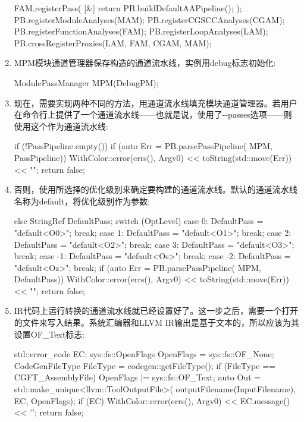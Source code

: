 \begin{enumerate}
\begin{cpp}
FAM.registerPass(
    [&] { return PB.buildDefaultAAPipeline(); });
PB.registerModuleAnalyses(MAM);
PB.registerCGSCCAnalyses(CGAM);
PB.registerFunctionAnalyses(FAM);
PB.registerLoopAnalyses(LAM);
PB.crossRegisterProxies(LAM, FAM, CGAM, MAM);
\end{cpp}

\item
MPM模块通道管理器保存构造的通道流水线，实例用debug标志初始化:

\begin{cpp}
ModulePassManager MPM(DebugPM);
\end{cpp}

\item
现在，需要实现两种不同的方法，用通道流水线填充模块通道管理器。若用户在命令行上提供了一个通道流水线——也就是说，使用了-{}-passes选项——则使用这个作为通道流水线:

\begin{cpp}
if (!PassPipeline.empty()) {
    if (auto Err = PB.parsePassPipeline(
    MPM, PassPipeline)) {
        WithColor::error(errs(), Argv0)
        << toString(std::move(Err)) << "\n";
        return false;
    }
}
\end{cpp}

\item
否则，使用所选择的优化级别来确定要构建的通道流水线。默认的通道流水线名称为default，将优化级别作为参数:

\begin{cpp}
else {
    StringRef DefaultPass;
    switch (OptLevel) {
        case 0: DefaultPass = "default<O0>"; break;
        case 1: DefaultPass = "default<O1>"; break;
        case 2: DefaultPass = "default<O2>"; break;
        case 3: DefaultPass = "default<O3>"; break;
        case -1: DefaultPass = "default<Os>"; break;
        case -2: DefaultPass = "default<Oz>"; break;
    }
    if (auto Err = PB.parsePassPipeline(
            MPM, DefaultPass)) {
        WithColor::error(errs(), Argv0)
        << toString(std::move(Err)) << "\n";
        return false;
    }
}
\end{cpp}


\item
IR代码上运行转换的通道流水线就已经设置好了。这一步之后，需要一个打开的文件来写入结果。系统汇编器和LLVM IR输出是基于文本的，所以应该为其设置OF\_Text标志:

\begin{cpp}
std::error_code EC;
sys::fs::OpenFlags OpenFlags = sys::fs::OF_None;
CodeGenFileType FileType = codegen::getFileType();
if (FileType == CGFT_AssemblyFile)
    OpenFlags |= sys::fs::OF_Text;
auto Out = std::make_unique<llvm::ToolOutputFile>(
    outputFilename(InputFilename), EC, OpenFlags);
if (EC) {
    WithColor::error(errs(), Argv0)
        << EC.message() << '\n';
    return false;
}
\end{cpp}


\end{enumerate}
